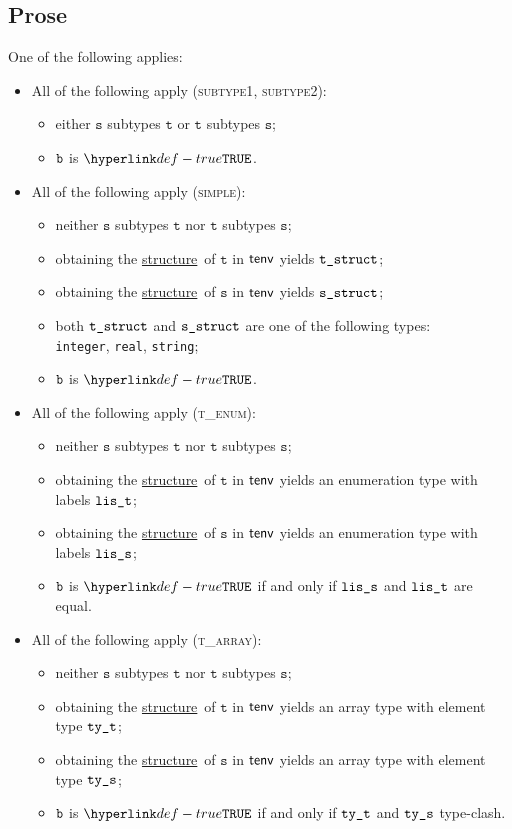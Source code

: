 \documentclass{book}
\newcommand\ProseOrTypeError[0]{\ProseTerminateAs{\TypeErrorConfig}}
\newcommand\structure[0]{\hyperlink{def-structure}{structure}}
\newcommand\vt[0]{\texttt{t}}
\newcommand\vs[0]{\texttt{s}}
\begin{document}
\subsection{Prose}
 One of the following applies:
\begin{itemize}
  \item All of the following apply (\textsc{subtype1}, \textsc{subtype2}):
  \begin{itemize}
    \item either $\vs$ subtypes $\vt$ or $\vt$ subtypes $\vs$;
    \item $\texttt{b}$ is $\True$.
  \end{itemize}

  \item All of the following apply (\textsc{simple}):
  \begin{itemize}
    \item neither $\vs$ subtypes $\vt$ nor $\vt$ subtypes $\vs$;
    \item obtaining the \structure\ of $\vt$ in $\textsf{tenv}$ yields $\texttt{t\_struct}$\ProseOrTypeError;
    \item obtaining the \structure\ of $\vs$ in $\textsf{tenv}$ yields $\texttt{s\_struct}$\ProseOrTypeError;
    \item both $\texttt{t\_struct}$ and $\texttt{s\_struct}$ are one of the following types: \\ \texttt{integer}, \texttt{real}, \texttt{string};
    \item $\texttt{b}$ is $\True$.
  \end{itemize}

  \item All of the following apply (\textsc{t\_enum}):
  \begin{itemize}
    \item neither $\vs$ subtypes $\vt$ nor $\vt$ subtypes $\vs$;
    \item obtaining the \structure\ of $\vt$ in $\textsf{tenv}$ yields an enumeration type with labels $\texttt{lis\_t}$;
    \item obtaining the \structure\ of $\vs$ in $\textsf{tenv}$ yields an enumeration type with labels $\texttt{lis\_s}$;
    \item $\texttt{b}$ is $\True$ if and only if $\texttt{lis\_s}$ and $\texttt{lis\_t}$ are equal.
  \end{itemize}

  \item All of the following apply (\textsc{t\_array}):
  \begin{itemize}
    \item neither $\vs$ subtypes $\vt$ nor $\vt$ subtypes $\vs$;
    \item obtaining the \structure\ of $\vt$ in $\textsf{tenv}$ yields an array type with element type $\texttt{ty\_t}$;
    \item obtaining the \structure\ of $\vs$ in $\textsf{tenv}$ yields an array type with element type $\texttt{ty\_s}$;
    \item $\texttt{b}$ is $\True$ if and only if $\texttt{ty\_t}$ and $\texttt{ty\_s}$ type-clash.
  \end{itemize}


\end{itemize}
\end{document}
